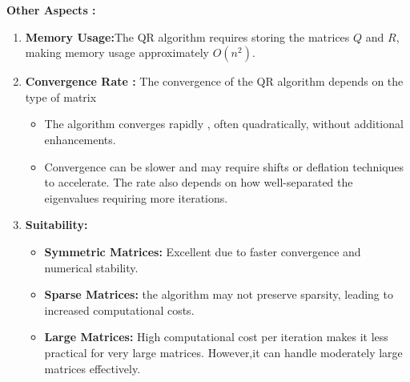 \documentclass[journal,12pt,onecolumn]{IEEEtran}
\theoremstyle{remark}
\begin{document}
\textbf{Other Aspects :}
\begin{enumerate}
    \item \textbf{Memory Usage:}The QR algorithm requires storing the matrices $Q$ and $R$, making memory usage approximately $O(n^2)$.\\

    \item \textbf{Convergence Rate :} The convergence of the QR algorithm depends on the type of matrix 
    \begin{itemize}
        \item The algorithm converges rapidly , often quadratically, without additional enhancements.

        \item Convergence can be slower and may require shifts or deflation techniques to accelerate. The rate also depends on how well-separated the eigenvalues requiring more iterations.\\
        
    \end{itemize}

    \item \textbf{Suitability:}
    \begin{itemize}
        \item \textbf{Symmetric Matrices:} Excellent due to faster convergence and numerical stability.

        \item \textbf{Sparse Matrices:} the algorithm may not preserve sparsity, leading to increased computational costs.

        \item \textbf{Large Matrices:} High computational cost per iteration makes it less practical for very large matrices. However,it can handle moderately large matrices effectively.\\
    \end{itemize}
\end{enumerate} 
\end{document}
